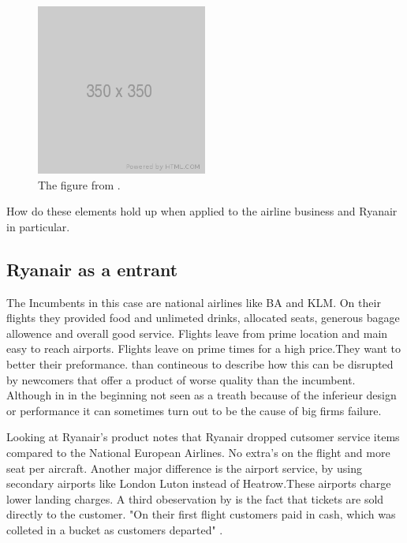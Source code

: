 \documentclass[a4paper, 11pt]{article}
\begin{document}
\begin{figure}[h!]
    \centering
    \includegraphics[width=0.5\textwidth]{350.png}
    \caption{The figure from \cite{Christensen97}.}
    \label{fig:graph1}
\end{figure}


How do these elements hold up when applied to the airline business and Ryanair in particular.


\subsection{Ryanair as a entrant}
\label{sec:this-is-a-section}


The Incumbents in this case are national airlines like BA and KLM. On their flights they provided food and unlimeted drinks, allocated seats, generous bagage allowence and overall good service. Flights leave from prime location and main easy to reach airports. Flights leave on prime times for a high price.They want to better their preformance. \cite{Christensen97} than contineous to describe how this can be disrupted by newcomers that offer a product of worse quality than the incumbent. Although in in the beginning not seen as a treath because of the inferieur design or performance it can sometimes turn out to be the cause of big firms failure.

Looking at Ryanair's product \cite{Barrett} notes that Ryanair dropped cutsomer service items compared to the National European Airlines. No extra's on the flight and more seat per aircraft. Another major difference is the airport service, by using secondary airports like London Luton instead of Heatrow.These airports charge lower landing charges. A third obeservation by \cite{Barrett} is the fact that tickets are sold directly to the customer. "On their first flight customers paid in cash, which was colleted in a bucket as customers departed" \citep{ITBberlin}.
\end{document}
